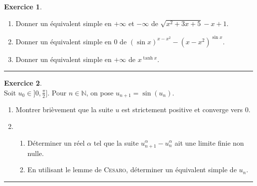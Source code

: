\documentclass[a4paper,10pt]{article}
\theoremstyle{definition}
\theoremstyle{definition}
\newtheorem{exo}{Exercice}
\newcommand{\N}{\mathbb{N}}
\begin{document}
\begin{minipage}{1\linewidth}
\begin{minipage}[t]{0.48\linewidth}
		
		
	\end{minipage}	
	\hfill\vrule\hfill
	\begin{minipage}[t]{0.48\linewidth}
		\raggedright
		
		
		\begin{exo}\quad\\[0.25cm]
			\begin{enumerate}
				\item  Donner un équivalent simple en $+\infty$ et $-\infty$ de $\sqrt{x^2+3x+5}-x+1$.
				\item Donner un équivalent simple en $0$ de $(\sin x)^{x-x^2}-(x-x^2)^{\sin x}$.
				\item  Donner un équivalent simple en $+\infty$ de $x^{\tanh x}$.
			\end{enumerate}
			
			\rule{1\linewidth}{0.6pt}
		\end{exo}	

		\begin{exo}\quad\\[0.25cm]
		
		Soit $u_0\in]0,\frac{\pi}{2}]$. Pour $n\in\N$, on pose $u_{n+1}=\sin(u_n)$.
		\begin{enumerate}
			\item  Montrer brièvement que la suite $u$ est strictement positive et converge vers $0$.
			\item 
			\begin{enumerate}
				\item Déterminer un réel $\alpha$ tel que la suite $u_{n+1}^\alpha-u_n^\alpha$ ait une limite finie non nulle.
				\item En utilisant le lemme de \textsc{Cesaro}, déterminer un équivalent simple de $u_n$.
			\end{enumerate}
		\end{enumerate}
		\centering
		\rule{1\linewidth}{0.6pt}
		\end{exo}	
		
		
	\end{minipage}
\end{minipage}	

\bigskip 
\end{document}
